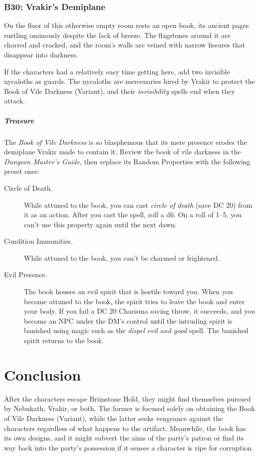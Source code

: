 \documentclass[10pt,a4paper,twoside,bg=print,twocolumn,openany,nodeprecatedcode]{dndbook}
\begin{document}
\subsubsection{B30: Vrakir's Demiplane}
\begin{DndReadAloud}{}
On the floor of this otherwise empty room rests an open book, its ancient pages rustling ominously despite the lack of breeze. The flagstones around it are charred and cracked, and the room's walls are veined with narrow fissures that disappear into darkness.

\end{DndReadAloud}

If the characters had a relatively easy time getting here, add two invisible nycaloths as guards. The nycaloths are mercenaries hired by Vrakir to protect the Book of Vile Darkness (Variant), and their \textit{invisibility} spells end when they attack.

\subparagraph{Treasure}
The \textit{Book of Vile Darkness} is so blasphemous that its mere presence erodes the demiplane Vrakir made to contain it. Review the book of vile darkness in the \textit{Dungeon Master's Guide}, then replace its Random Properties with the following preset ones:


\begin{description}
\item[Circle of Death.]
While attuned to the book, you can cast \textit{circle of death} (save DC 20) from it as an action. After you cast the spell, roll a d6. On a roll of 1–5, you can't use this property again until the next dawn.
\item[Condition Immunities.]
While attuned to the book, you can't be charmed or frightened.
\item[Evil Presence.]
The book houses an evil spirit that is hostile toward you. When you become attuned to the book, the spirit tries to leave the book and enter your body. If you fail a DC 20 Charisma saving throw, it succeeds, and you become an NPC under the DM's control until the intruding spirit is banished using magic such as the \textit{dispel evil and good} spell. The banished spirit returns to the book.
\end{description}

\section{Conclusion}
After the characters escape Brimstone Hold, they might find themselves pursued by Nebukath, Vrakir, or both. The former is focused solely on obtaining the Book of Vile Darkness (Variant), while the latter seeks vengeance against the characters regardless of what happens to the artifact. Meanwhile, the book has its own designs, and it might subvert the aims of the party's patron or find its way back into the party's possession if it senses a character is ripe for corruption.
\end{document}
